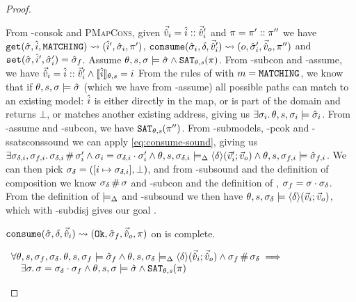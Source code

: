 \begin{proof}
\begin{hypvlist}
 From \hyp{consok} and \textsc{PMapCons}, given $\vec{\hat{v}}_i=\hat{i}::\vec{\hat{v}}_i'$ and $\pi=\pi'::\pi''$ we have $\texttt{get}(\hat{\sigma},\hat{i},\texttt{MATCHING})\rightsquigarrow(\hat{i}', \hat{\sigma}_i, \pi')$, ${\texttt{consume}(\hat{\sigma}_i,\delta,\vec{\hat{v}}_i')\rightsquigarrow (o,\hat{\sigma}_i',\vec{\hat{v}}_o,\pi'')}$ and $\texttt{set}(\hat{\sigma},\hat{i}',\hat{\sigma}_i')=\hat{\sigma}_f$.
 Assume $\theta,s,\sigma\models \hat{\sigma} \land \texttt{SAT}_{\mathit{\theta,s}}(\pi)$.
 From \hyp{subcon} and \hyp{assume}, we have $\vec{\hat{v}}_i=\hat{i}::\vec{\hat{v}}_i' \land \llbracket\hat{i}\rrbracket_{\theta,s}=i$
 From the rules of  with $m=\texttt{MATCHING}$, we know that if $\theta,s,\sigma\models\hat{\sigma}$ (which we have from \hyp{assume}) all possible paths can match to an existing model: $\hat{i}$ is either directly in the map, or is part of the domain and returns $\bot$, or matches another existing address, giving us $\exists \sigma_i\ldotp \theta,s,\sigma_i\models\hat{\sigma}_i$.
 From \hyp{assume} and \hyp{subcon}, we have $\texttt{SAT}_{\mathit{\theta,s}}(\pi'')$.
 From \hyp{submodels}, \hyp{pcok} and \hyp{ssatsconssound} we can apply \ref{eq:consume-sound}, giving us $\exists \sigma_{\delta,i}, \sigma_{f,i}\ldotp \sigma_{\delta,i}\operatorname{\#} \sigma_i' \land \sigma_i=\sigma_{\delta,i}\cdot\sigma_i' \land \theta,s,\sigma_{\delta,i}\models_{\Delta} \left<\delta\right>\!(\vec{v}_i';\vec{v}_o) \land \theta,s,\sigma_{f,i}\models\hat{\sigma}_{f,i}$.
 We can then pick $\sigma_\delta=([i\mapsto \sigma_{\delta,i}], \bot)$, and from \hyp{subsound} and the definition of composition we know $\sigma_\delta\operatorname{\#}\sigma$ and \hyp{subcon} and the definition of , $\sigma_f=\sigma\cdot\sigma_\delta$.
 From the definition of $\models_{\Delta}$ and \hyp{subsound} we then have $\theta,s,\sigma_\delta\models\left<\delta\right>\!(\vec{v}_i;\vec{v}_o)$, which with \hyp{subdisj} gives our goal .
\end{hypvlist}


\pfassume \begin{hypvlist}
 $\texttt{consume}(\hat{\sigma},\delta,\vec{\hat{v}}_i)\rightsquigarrow (\texttt{Ok},\hat{\sigma}_f,\vec{\hat{v}}_o,\pi)$
 \consume{} on \mmdl{} is complete.
\end{hypvlist}
\pfprove \begin{goalvlist}
 $\begin{array}{l}
\forall \theta,s,\sigma_f,\sigma_\delta\ldotp \theta,s,\sigma_f\models \hat{\sigma}_f \land \theta, s, \sigma_\delta \models_{\Delta} \left<\delta\right>\!(\vec{\hat{v}}_i;\vec{\hat{v}}_o) \land \sigma_f\operatorname{\#}\sigma_\delta \implies \\
\quad \exists \sigma\ldotp \sigma = \sigma_\delta \cdot \sigma_f \land \theta,s,\sigma\models \hat{\sigma} \land \texttt{SAT}_{\mathit{\theta,s}}(\pi)
\end{array}$
\end{goalvlist}


\end{proof}
